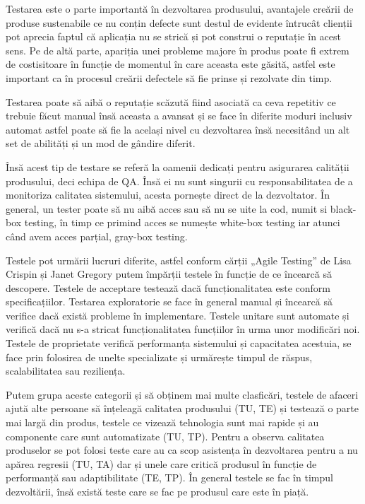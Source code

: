 Testarea este o parte importantă în dezvoltarea produsului, avantajele creării de produse
sustenabile ce nu conțin defecte sunt destul de evidente întrucât clienții pot aprecia
faptul că aplicația nu se strică și pot construi o reputație în acest sens. Pe de altă parte,
apariția unei probleme majore în produs poate fi extrem de costisitoare în funcție de momentul
în care aceasta este găsită, astfel este important ca în procesul creării defectele să
fie prinse și rezolvate din timp.

Testarea poate să aibă o reputație scăzută fiind asociată ca ceva repetitiv ce trebuie făcut
manual însă aceasta a avansat și se face în diferite moduri inclusiv automat astfel poate
să fie la același nivel cu dezvoltarea însă necesitând un alt set de abilități și un mod
de gândire diferit.

Însă acest tip de testare se referă la oamenii dedicați pentru asigurarea calității produsului,
deci echipa de QA. Însă ei nu sunt singurii cu responsabilitatea de a monitoriza
calitatea sistemului, acesta pornește direct de la dezvoltator. În general, un tester poate
să nu aibă acces sau să nu se uite la cod, numit si black-box testing, în timp ce primind
acces se numește white-box testing iar atunci când avem acces parțial, gray-box testing.

Testele pot urmării lucruri diferite, astfel conform cărții „Agile Testing” de Lisa Crispin
și Janet Gregory putem împărții testele în funcție de ce încearcă să descopere. Testele de acceptare
testează dacă funcționalitatea este conform specificațiilor. Testarea exploratorie se face
în general manual și încearcă să verifice dacă există probleme în implementare. Testele unitare
sunt automate și verifică dacă nu s-a stricat funcționalitatea funcțiilor în urma unor modificări noi.
Testele de proprietate verifică performanța sistemului și capacitatea acestuia, se face
prin folosirea de unelte specializate și urmărește timpul de răspus, scalabilitatea sau reziliența.

Putem grupa aceste categorii și să obținem mai multe clasficări, testele de afaceri ajută
alte persoane să înțeleagă calitatea produsului (TU, TE) și testează o parte mai largă din produs,
testele ce vizează tehnologia sunt mai rapide și au componente care sunt automatizate (TU, TP).
Pentru a observa calitatea produselor se pot folosi teste care au ca scop asistența în dezvoltarea
pentru a nu apărea regresii (TU, TA) dar și unele care critică produsul în funcție de performanță
sau adaptibilitate (TE, TP). În general testele se fac în timpul dezvoltării, însă există teste 
care se fac pe produsul care este în piață.

